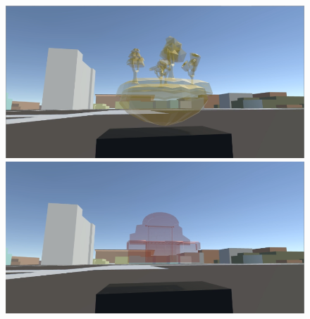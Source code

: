 \begin{appendices}
\begin{figure}
	\par \smallskip
	\includegraphics[width=0.9\linewidth]{figures/tracing_shapes/finalstudy_shapes5}
	\par \smallskip
	\includegraphics[width=0.9\linewidth]{figures/tracing_shapes/finalstudy_shapes6}
	\par \smallskip
\end{figure}
\begin{figure}
	\centering
	

\end{figure}
\end{appendices}
